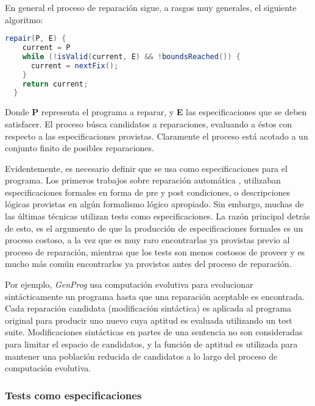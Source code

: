 En general el proceso de reparaci\'on sigue, a rasgos muy generales, el siguiente algoritmo:

\begin{lstlisting}[basicstyle={}, language=Java]
  repair(P, E) {
    current = P
    while (!isValid(current, E) && !boundsReached()) {
      current = nextFix();
    }
    return current;
  }
\end{lstlisting}

Donde \textbf{P} representa el programa a reparar, y \textbf{E} las especificaciones que se deben satisfacer. El proceso b\'usca candidatos a reparaciones, evaluando a \'estos con respecto a las especificaciones provistas. Claramente el proceso est\'a acotado a un conjunto finito de posibles reparaciones.

Evidentemente, es necesario definir que se usa como especificaciones para el programa. Los primeros trabajos sobre reparaci\'on autom\'atica \cite{bibliography.repair.StaberJB05, bibliography.repair.ArcuriY08}, utilizaban especificaciones formales en forma de pre y post condiciones, o descripciones l\'ogicas provistas en alg\'un formalismo l\'ogico apropiado. Sin embargo, muchas de las \'ultimas t\'ecnicas utilizan tests como especificaciones. La raz\'on principal detr\'as de esto, es el argumento de que la producci\'on de especificaciones formales es un proceso costoso, a la vez que es muy raro encontrarlas ya provistas previo al proceso de reparaci\'on, mientras que los tests son menos costosos de proveer y es mucho m\'as com\'un encontrarlos ya provistos antes del proceso de reparaci\'on.

Por ejemplo, \emph{GenProg} \cite{bibliography.repair.GouesNFW12} usa computaci\'on evolutiva para evolucionar sint\'acticamente un programa hasta que una reparaci\'on aceptable es encontrada. Cada reparaci\'on candidata (modificaci\'on sint\'actica) es aplicada al programa original para producir uno nuevo cuya aptitud es evaluada utilizando un test suite. Modificaciones sint\'acticas en partes de una sentencia no son consideradas para limitar el espacio de candidatos, y la funci\'on de aptitud es utilizada para mantener una poblaci\'on reducida de candidatos a lo largo del proceso de computaci\'on evolutiva. 

\subsubsection{Tests como especificaciones}
\label{sec:repair.specs.testsAsSpecs}

